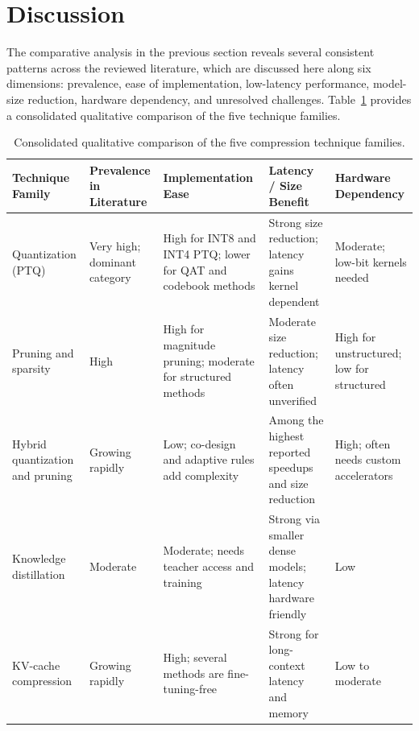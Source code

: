 \documentclass[
11pt, %
english, %
singlespacing, %
headsepline, %
]{MastersDoctoralThesis} %
\begin{document}
\section{Discussion}
\label{sec:lr-discussion}

The comparative analysis in the previous section reveals several consistent patterns across the reviewed literature, which are discussed here along six dimensions: prevalence, ease of implementation, low-latency performance, model-size reduction, hardware dependency, and unresolved challenges. Table~\ref{tab:lr-families} provides a consolidated qualitative comparison of the five technique families.

\begin{table}[htbp]
\centering
\scriptsize
\caption{Consolidated qualitative comparison of the five compression technique families.}
\label{tab:lr-families}
\renewcommand{\arraystretch}{1.2}
\begin{tabular}{p{}p{}p{}p{}p{}}
\hline
\textbf{Technique Family} & \textbf{Prevalence in Literature} & \textbf{Implementation Ease} & \textbf{Latency / Size Benefit} & \textbf{Hardware Dependency} \\
\hline
Quantization (PTQ) & Very high; dominant category & High for INT8 and INT4 PTQ; lower for QAT and codebook methods & Strong size reduction; latency gains kernel dependent & Moderate; low-bit kernels needed \\
Pruning and sparsity & High & High for magnitude pruning; moderate for structured methods & Moderate size reduction; latency often unverified & High for unstructured; low for structured \\
Hybrid quantization and pruning & Growing rapidly & Low; co-design and adaptive rules add complexity & Among the highest reported speedups and size reduction & High; often needs custom accelerators \\
Knowledge distillation & Moderate & Moderate; needs teacher access and training & Strong via smaller dense models; latency hardware friendly & Low \\
KV-cache compression & Growing rapidly & High; several methods are fine-tuning-free & Strong for long-context latency and memory & Low to moderate \\
\hline
\end{tabular}
\end{table}
\end{document}
